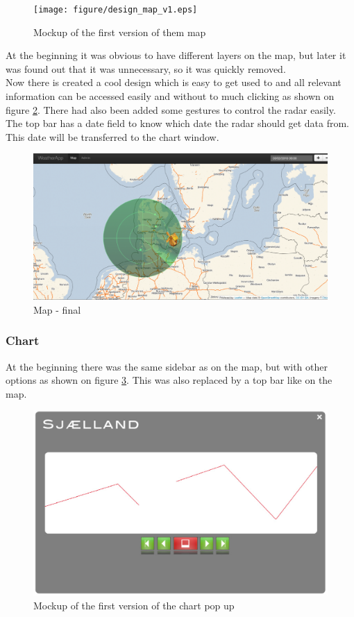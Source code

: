 \begin{figure}[htbp]
   \centering
   \texttt{[image: figure/design\_map\_v1.eps]}
   \caption{Mockup of the first version of them map}
   \label{fig:map_v1}
\end{figure}

At the beginning it was obvious to have different layers on the map, but later it was found out that it was unnecessary, so it was quickly removed.\\
Now there is created a cool design which is easy to get used to and all relevant information can be accessed easily and without to much clicking as shown on figure \ref{fig:map_final}.
There had also been added some gestures to control the radar easily.\\
The top bar has a date field to know which date the radar should get data from. This date will be transferred to the chart window.

\begin{figure}[htbp]
   \centering
   \includegraphics[width=1\linewidth]{figure/design_map_final.eps}
   \caption{Map - final}
   \label{fig:map_final}
\end{figure}

\subsubsection{Chart}
At the beginning there was the same sidebar as on the map, but with other options as shown on figure \ref{fig:chart_v1}. This was also replaced by a top bar like on the map.

\begin{figure}[htbp]
   \centering
   \includegraphics[width=1\linewidth]{figure/design_chart_v1.eps}
   \caption{Mockup of the first version of the chart pop up}
   \label{fig:chart_v1}
\end{figure}

